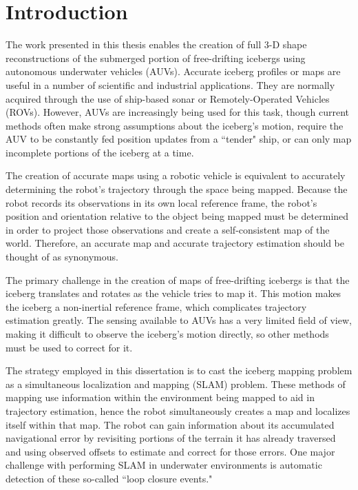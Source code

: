 
\chapter{Introduction}
\label{ch.Introduction}
The work presented in this thesis enables the creation of full 3-D shape reconstructions of the submerged portion of free-drifting icebergs using autonomous underwater vehicles (AUVs). Accurate iceberg profiles or maps are useful in a number of scientific and industrial applications. They are normally acquired through the use of ship-based sonar or Remotely-Operated Vehicles (ROVs). However, AUVs are increasingly being used for this task, though current methods often make strong assumptions about the iceberg's motion, require the AUV to be constantly fed position updates from a ``tender" ship, or can only map incomplete portions of the iceberg at a time. \cite{}

The creation of accurate maps using a robotic vehicle is equivalent to accurately determining the robot's trajectory through the space being mapped. Because the robot records its observations in its own local reference frame, the robot's position and orientation relative to the object being mapped must be determined in order to project those observations and create a self-consistent map of the world. Therefore, an accurate map and accurate trajectory estimation should be thought of as synonymous.

The primary challenge in the creation of maps of free-drifting icebergs is that the iceberg translates and rotates as the vehicle tries to map it. This motion makes the iceberg a non-inertial reference frame, which complicates trajectory estimation greatly. The sensing available to AUVs has a very limited field of view, making it difficult to observe the iceberg's motion directly, so other methods must be used to correct for it. 

The strategy employed in this dissertation is to cast the iceberg mapping problem as a simultaneous localization and mapping (SLAM) problem. These methods of mapping use information within the environment being mapped to aid in trajectory estimation, hence the robot simultaneously creates a map and localizes itself within that map. The robot can gain information about its accumulated navigational error by revisiting portions of the terrain it has already traversed and using observed offsets to estimate and correct for those errors. One major challenge with performing SLAM in underwater environments is automatic detection of these so-called ``loop closure events."

